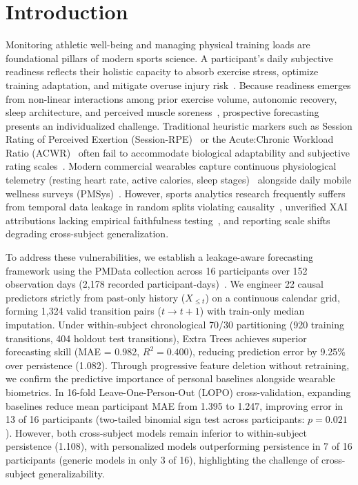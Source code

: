 \documentclass[runningheads]{llncs}
\begin{document}
\section{Introduction}
Monitoring athletic well-being and managing physical training loads are foundational pillars of modern sports science. A participant's daily subjective readiness reflects their holistic capacity to absorb exercise stress, optimize training adaptation, and mitigate overuse injury risk~\cite{bourdon2017,drew2016}. Because readiness emerges from non-linear interactions among prior exercise volume, autonomic recovery, sleep architecture, and perceived muscle soreness~\cite{halson2014,saw2016}, prospective forecasting presents an individualized challenge. Traditional heuristic markers such as Session Rating of Perceived Exertion (Session-RPE)~\cite{foster2001} or the Acute:Chronic Workload Ratio (ACWR)~\cite{gabbett2016} often fail to accommodate biological adaptability and subjective rating scales~\cite{windt2017}. Modern commercial wearables capture continuous physiological telemetry (resting heart rate, active calories, sleep stages)~\cite{seshadri2019} alongside daily mobile wellness surveys (PMSys)~\cite{thambawita2020pmdata}. However, sports analytics research frequently suffers from temporal data leakage in random splits violating causality~\cite{kapoor2023}, unverified XAI attributions lacking empirical faithfulness testing~\cite{guidotti2018,hooker2019}, and reporting scale shifts degrading cross-subject generalization.

To address these vulnerabilities, we establish a leakage-aware forecasting framework using the PMData collection across 16 participants over 152 observation days (2,178 recorded participant-days)~\cite{thambawita2020pmdata}. We engineer 22 causal predictors strictly from past-only history ($X_{\leq t}$) on a continuous calendar grid, forming 1,324 valid transition pairs ($t \to t+1$) with train-only median imputation. Under within-subject chronological 70/30 partitioning (920 training transitions, 404 holdout test transitions), Extra Trees achieves superior forecasting skill (MAE = 0.982, $R^2 = 0.400$), reducing prediction error by 9.25\% over persistence (1.082). Through progressive feature deletion without retraining, we confirm the predictive importance of personal baselines alongside wearable biometrics. In 16-fold Leave-One-Person-Out (LOPO) cross-validation, expanding baselines reduce mean participant MAE from 1.395 to 1.247, improving error in 13 of 16 participants (two-tailed binomial sign test across participants: $p = 0.021$). However, both cross-subject models remain inferior to within-subject persistence (1.108), with personalized models outperforming persistence in 7 of 16 participants (generic models in only 3 of 16), highlighting the challenge of cross-subject generalizability.
\end{document}
